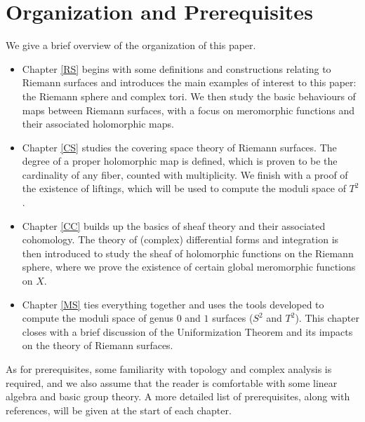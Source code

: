 \documentclass[../Moduli_Spaces_of_Riemann_Surfaces.tex]{subfiles}
\begin{document}
    \section{Organization and Prerequisites}
    We give a brief overview of the organization of this paper.
    \begin{itemize}
        \item Chapter \ref{RS} begins with some definitions and constructions relating to Riemann surfaces and introduces the main examples of interest to this paper: the Riemann sphere and complex tori. We then study the basic behaviours of maps between Riemann surfaces, with a focus on meromorphic functions and their associated holomorphic maps.
            \vspace{-0.05in}
        \item Chapter \ref{CS} studies the covering space theory of Riemann surfaces. The degree of a proper holomorphic map is defined, which is proven to be the cardinality of any fiber, counted with multiplicity. We finish with a proof of the existence of liftings, which will be used to compute the moduli space of $T^2$.
            \vspace{-0.05in}
        \item Chapter \ref{CC} builds up the basics of sheaf theory and their associated cohomology. The theory of (complex) differential forms and integration is then introduced to study the sheaf of holomorphic functions on the Riemann sphere, where we prove the existence of certain global meromorphic functions on $X$.
            \vspace{-0.05in}
        \item Chapter \ref{MS} ties everything together and uses the tools developed to compute the moduli space of genus $0$ and $1$ surfaces ($S^2$ and $T^2$). This chapter closes with a brief discussion of the Uniformization Theorem and its impacts on the theory of Riemann surfaces.
    \end{itemize}
    As for prerequisites, some familiarity with topology and complex analysis is required, and we also assume that the reader is comfortable with some linear algebra and basic group theory. A more detailed list of prerequisites, along with references, will be given at the start of each chapter.
\end{document}
